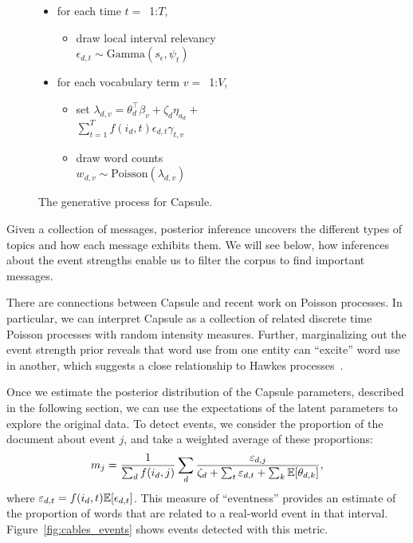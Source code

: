 \begin{figure}[!ht]
\begin{mdframed}[userdefinedwidth=3.0in,align=center]
\begin{itemize}[leftmargin=*]
\begin{itemize}[leftmargin=*]
\begin{itemize}[leftmargin=*]
		\end{itemize}
	\item for each time $t=$~1:$T$,
		\begin{itemize}[leftmargin=*]
			\item draw local interval relevancy \\$\epsilon_{d,t} \sim \mbox{Gamma}(s_\epsilon, \psi_{t})$ 
		\end{itemize}
	\item for each vocabulary term $v=$~1:$V$,
		\begin{itemize}[leftmargin=*]
			\item set $\lambda_{d,v} = \theta_d^\top\beta_v  + \zeta_d \eta_{a_d} +$\\$ \sum_{t=1}^T f(i_d, t) \epsilon_{d,t} \gamma_{t,v}$
			\item draw word counts \\$w_{d,v} \sim \mbox{Poisson}\left(\lambda_{d,v}\right)$
		\end{itemize}
	\end{itemize}
\end{itemize}
\end{mdframed}
\caption{The generative process for Capsule.}
\label{fig:generative-model}
\end{figure}

Given a collection of messages, posterior inference uncovers the
different types of topics and how each message exhibits them. We will
see below, how inferences about the event strengths enable us to
filter the corpus to find important messages.

There are connections between Capsule and recent work on Poisson
processes. In particular, we can interpret Capsule as a collection of
related discrete time Poisson processes with random intensity
measures. Further, marginalizing out the event strength prior reveals
that word use from one entity can ``excite'' word use in another, which
suggests a close relationship to Hawkes processes~\cite{hawkes1971spectra}.


Once we estimate the posterior distribution of the Capsule parameters, described in the following section, we can use the expectations of the latent parameters to explore the original data.  To detect events, we consider the proportion of the document about event $j$, and take a weighted average of these proportions:
\begin{equation*}
m_j = \frac{1}{\sum_{d} f(i_d, j)} \sum_{d}\frac{\varepsilon_{d,j}}{\zeta_d + \sum_{t} \varepsilon_{d,t} + \sum_{k} \mathbb{E}[\theta_{d,k}] },
\label{eq:eventness}
\end{equation*}
where $\varepsilon_{d,t} = f(i_d, t) \mathbb{E}[\epsilon_{d,t}]$.
This measure of ``eventness'' provides an estimate of the proportion of words that are related to a real-world event in that interval.  Figure~\ref{fig:cables_events} shows events detected with this metric.

